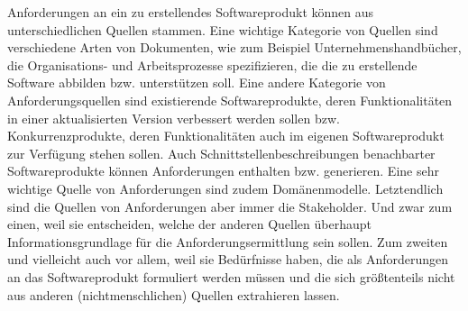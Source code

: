 \vspace{2mm} %


Anforderungen an ein zu erstellendes Softwareprodukt können aus unterschiedlichen Quellen stammen. Eine wichtige Kategorie von Quellen sind verschiedene Arten von Dokumenten, wie zum Beispiel Unternehmenshandbücher, die Organisations- und Arbeitsprozesse spezifizieren, die die zu erstellende Software abbilden bzw. unter\-stützen soll. Eine andere Kategorie von Anforderungsquellen sind existierende Softwareprodukte, deren Funktionalitäten in einer aktualisierten Version verbessert werden sollen bzw. Konkurrenzprodukte, deren Funktionalitäten auch im eigenen Softwareprodukt zur Verfügung stehen sollen. Auch Schnittstellenbeschreibungen benachbarter Softwareprodukte können Anforderungen enthalten bzw. generieren. Eine sehr wichtige Quelle von Anforderungen sind zudem Domänenmodelle. Letztendlich sind die Quellen von Anforderungen aber immer die Stakeholder. Und zwar zum einen, weil sie entscheiden, welche der anderen Quellen überhaupt Infor\-mations\-grundlage für die Anforderungsermittlung sein sollen. Zum zweiten und vielleicht auch vor allem, weil sie Bedürfnisse haben, die als Anforderungen an das Softwareprodukt formuliert werden müssen und die sich größtenteils nicht aus anderen (nichtmenschlichen) Quellen extrahieren lassen.